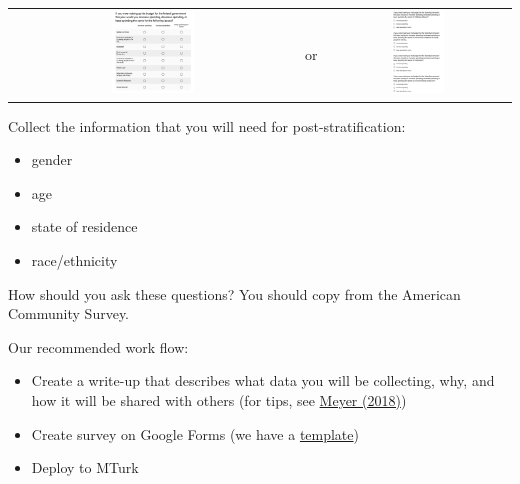 \documentclass[aspectratio=169]{beamer}
\begin{document}
\begin{frame}

\begin{center}
\begin{tabular}{ccc}
\includegraphics[width=0.30\textwidth]{figures/MTurk_survey_grid} & \phantom{12} \LARGE{or} \phantom{12}  & \includegraphics[width=0.30\textwidth]{figures/MTurk_survey_list}
\end{tabular}
\end{center}

\end{frame}
\begin{frame}

Collect the information that you will need for post-stratification: \pause
\begin{itemize}
\item gender
\item age
\item state of residence
\item race/ethnicity
\end{itemize}

How should you ask these questions?  \pause You should copy from the American Community Survey.

\end{frame}
\begin{frame}

Our recommended work flow:
\begin{itemize}
\item Create a write-up that describes what data you will be collecting, why, and how it will be shared with others (for tips, see \href{https://doi.org/10.1177/2515245917747656}{Meyer (2018)})
\item Create survey on Google Forms (we have a \href{https://github.com/compsocialscience/summer-institute/blob/master/2019/materials/day4-surveys/activity/2019-06-13_mturk_google_survey.pdf}{template})
\pause
\item Deploy to MTurk
\end{itemize}

\end{frame}
\end{document}

